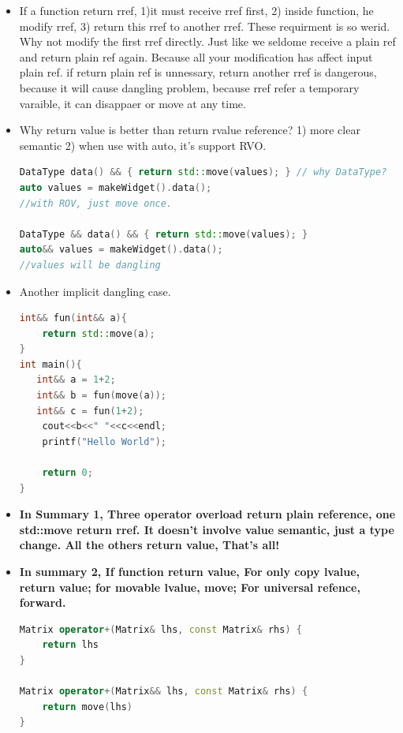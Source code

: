 \documentclass[a4paper,12pt,twoside]{book}
\begin{document}
\begin{itemize}
\item If a function return rref, 1)it must receive rref first,  2) inside function, he modify rref, 3) return this rref to another rref. These requirment is so werid. Why not modify the first rref directly. Just like we seldome receive a plain ref and return plain ref again. Because all your modification has affect input plain ref.  if return plain ref is unnessary, return another rref is dangerous, because it will cause dangling problem, because rref refer a temporary varaible, it can disappaer or move at any time.

\item Why return value is better than return rvalue reference? 1) more clear semantic 2) when use with auto, it's support RVO. 
\begin{lstlisting}[frame=single, language=c++]
DataType data() && { return std::move(values); } // why DataType?
auto values = makeWidget().data();
//with ROV, just move once. 

DataType && data() && { return std::move(values); }
auto&& values = makeWidget().data();
//values will be dangling
\end{lstlisting}

\item Another implicit dangling case. 
\begin{lstlisting}[frame=single, language=c++]
int&& fun(int&& a){
    return std::move(a);
}
int main(){
   int&& a = 1+2;
   int&& b = fun(move(a));
   int&& c = fun(1+2);
    cout<<b<<" "<<c<<endl;
    printf("Hello World");

    return 0;
}
\end{lstlisting}



\item \textbf{In Summary 1, Three operator overload return plain reference, one std::move return rref. It doesn't involve value semantic, just a type change. All the others return value, That's all!}

\item \textbf{In summary 2, If function return value, For only copy lvalue, return value; for movable lvalue, move;  For universal refence, forward. }

\begin{lstlisting}[frame=single, language=c++]
Matrix operator+(Matrix& lhs, const Matrix& rhs) {
    return lhs
}

Matrix operator+(Matrix&& lhs, const Matrix& rhs) {
    return move(lhs)
}


\end{lstlisting}
\end{itemize}
\end{document}
